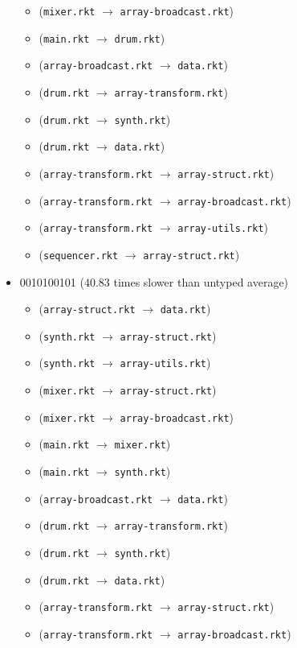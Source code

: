 \documentclass{article}
\newcommand{\mono}[1]{\texttt{#1}}
\begin{document}
\begin{itemize}
\begin{itemize}
  \item (\mono{mixer.rkt} $\rightarrow$ \mono{array-broadcast.rkt})
  \item (\mono{main.rkt} $\rightarrow$ \mono{drum.rkt})
  \item (\mono{array-broadcast.rkt} $\rightarrow$ \mono{data.rkt})
  \item (\mono{drum.rkt} $\rightarrow$ \mono{array-transform.rkt})
  \item (\mono{drum.rkt} $\rightarrow$ \mono{synth.rkt})
  \item (\mono{drum.rkt} $\rightarrow$ \mono{data.rkt})
  \item (\mono{array-transform.rkt} $\rightarrow$ \mono{array-struct.rkt})
  \item (\mono{array-transform.rkt} $\rightarrow$ \mono{array-broadcast.rkt})
  \item (\mono{array-transform.rkt} $\rightarrow$ \mono{array-utils.rkt})
  \item (\mono{sequencer.rkt} $\rightarrow$ \mono{array-struct.rkt})
  \end{itemize}
\item 0010100101 (40.83 times slower than untyped average)
  \begin{itemize}
  \item (\mono{array-struct.rkt} $\rightarrow$ \mono{data.rkt})
  \item (\mono{synth.rkt} $\rightarrow$ \mono{array-struct.rkt})
  \item (\mono{synth.rkt} $\rightarrow$ \mono{array-utils.rkt})
  \item (\mono{mixer.rkt} $\rightarrow$ \mono{array-struct.rkt})
  \item (\mono{mixer.rkt} $\rightarrow$ \mono{array-broadcast.rkt})
  \item (\mono{main.rkt} $\rightarrow$ \mono{mixer.rkt})
  \item (\mono{main.rkt} $\rightarrow$ \mono{synth.rkt})
  \item (\mono{array-broadcast.rkt} $\rightarrow$ \mono{data.rkt})
  \item (\mono{drum.rkt} $\rightarrow$ \mono{array-transform.rkt})
  \item (\mono{drum.rkt} $\rightarrow$ \mono{synth.rkt})
  \item (\mono{drum.rkt} $\rightarrow$ \mono{data.rkt})
  \item (\mono{array-transform.rkt} $\rightarrow$ \mono{array-struct.rkt})
  \item (\mono{array-transform.rkt} $\rightarrow$ \mono{array-broadcast.rkt})

\end{itemize}
\end{itemize}
\end{document}
